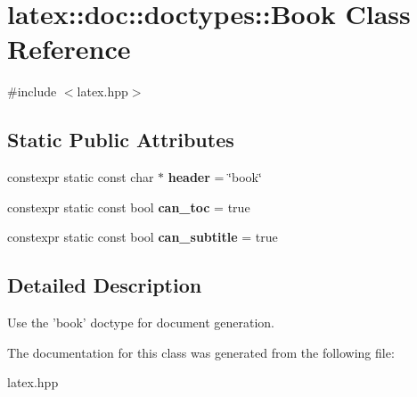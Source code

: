 \hypertarget{classlatex_1_1doc_1_1doctypes_1_1Book}{\section{latex\-:\-:doc\-:\-:doctypes\-:\-:\-Book \-Class \-Reference}
\label{classlatex_1_1doc_1_1doctypes_1_1Book}
}


{\ttfamily \#include $<$latex.\-hpp$>$}

\subsection*{\-Static \-Public \-Attributes}
\begin{DoxyCompactItemize}
\item 
\hypertarget{classlatex_1_1doc_1_1doctypes_1_1Book_a36a8b56c9502dab4a4301b1153851540}{constexpr static const char $\ast$ {\bfseries header} = \char`\"{}book\char`\"{}}\label{classlatex_1_1doc_1_1doctypes_1_1Book_a36a8b56c9502dab4a4301b1153851540}

\item 
\hypertarget{classlatex_1_1doc_1_1doctypes_1_1Book_ac71f7b7b881db6ae5b9fa295b02b30f0}{constexpr static const bool {\bfseries can\-\_\-toc} = true}\label{classlatex_1_1doc_1_1doctypes_1_1Book_ac71f7b7b881db6ae5b9fa295b02b30f0}

\item 
\hypertarget{classlatex_1_1doc_1_1doctypes_1_1Book_a07a5af234d52ca56082d3a7d58af5615}{constexpr static const bool {\bfseries can\-\_\-subtitle} = true}\label{classlatex_1_1doc_1_1doctypes_1_1Book_a07a5af234d52ca56082d3a7d58af5615}

\end{DoxyCompactItemize}


\subsection{\-Detailed \-Description}
\-Use the 'book' doctype for document generation. 

\-The documentation for this class was generated from the following file\-:\begin{DoxyCompactItemize}
\item 
latex.\-hpp\end{DoxyCompactItemize}
